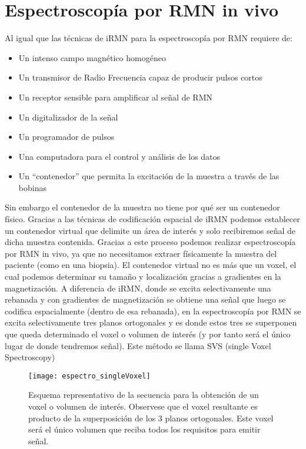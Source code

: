 \section{Espectroscopía por RMN in vivo}
Al igual que las técnicas de iRMN para la espectroscopía por RMN requiere de:

\begin{itemize}
  \item Un intenso campo magnético homogéneo
  \item Un transmisor de Radio Frecuencia capaz de producir pulsos cortos
  \item Un receptor sensible para amplificar al señal de RMN
  \item Un digitalizador de la señal 
  \item Un programador de pulsos
  \item Una computadora para el control y análisis de los datos
  \item Un ``contenedor'' que permita la excitación de la muestra a través de las bobinas
\end{itemize}


Sin embargo el contenedor de la muestra no tiene por qué ser un contenedor físico. Gracias a las técnicas de codificación espacial de iRMN podemos establecer un contenedor virtual que delimite un área de interés y solo recibiremos señal de dicha muestra contenida. Gracias a este proceso podemos realizar espectroscopía por RMN in vivo, ya que no necesitamos extraer físicamente la muestra del paciente (como en una biopsia). El contenedor virtual no es más que un voxel, el cual podemos determinar su tamaño y localización gracias a gradientes en la magnetización. A diferencia de iRMN, donde se excita selectivamente una rebanada y con gradientes de magnetización se obtiene una señal que luego se codifica espacialmente (dentro de esa rebanada), en la espectroscopía por RMN  se excita selectivamente tres planos ortogonales y es donde estos tres se superponen que queda determinado el voxel o volumen de interés (y por tanto será el único lugar de donde tendremos señal). Este método se llama SVS (single Voxel Spectroscopy)

\begin{figure}[htb]
 \begin{figg}
   \texttt{[image: espectro\_singleVoxel]}
   \caption{Esquema representativo de la secuencia para la obtención de un voxel o volumen de interés. Observese que el voxel resultante es producto de la superposición de los 3 planos ortogonales. Este voxel será el único volumen que reciba todos los requisitos para emitir señal.}
 \label{fig:espectro_singleVoxel}
 \end{figg}
\end{figure}





